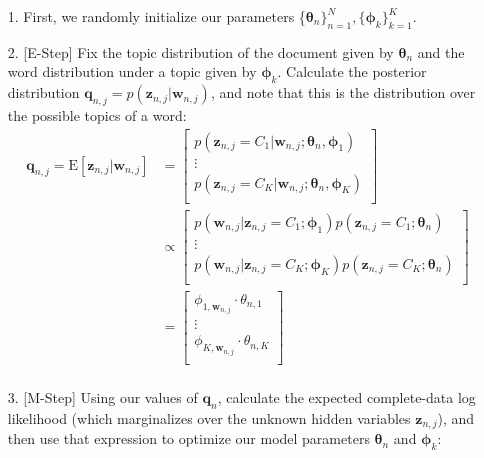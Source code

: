 \begin{itemize}
    \item[1.] First, we randomly initialize our parameters \{$\boldsymbol{\theta}_n \}_{n=1}^{N}, \{ \boldsymbol{\phi}_k\}_{k=1}^{K}$.
    \item[2.] [E-Step] Fix the topic distribution of the document given by $\boldsymbol{\theta}_n$ and the word distribution under a topic given by $\boldsymbol{\phi}_k$. Calculate the posterior distribution $\textbf{q}_{n, j} = p(\textbf{z}_{n, j} | \textbf{w}_{n, j})$, and note that this is the distribution over the possible topics of a word:
        \begin{align*}
            \textbf{q}_{n, j} = \mathrm{E}[\textbf{z}_{n, j} | \textbf{w}_{n, j}] &= \begin{bmatrix}
                p(\textbf{z}_{n, j} = C_1 | \textbf{w}_{n, j}; \boldsymbol{\theta}_n, \boldsymbol{\phi}_1) \\
                \vdots \\
                p(\textbf{z}_{n, j} = C_K | \textbf{w}_{n, j}; \boldsymbol{\theta}_n, \boldsymbol{\phi}_K) \\
            \end{bmatrix} \\
            &\propto \begin{bmatrix}
                p(\textbf{w}_{n, j} | \textbf{z}_{n, j} = C_1; \boldsymbol{\phi}_1) p(\textbf{z}_{n, j}  = C_1; \boldsymbol{\theta}_n) \\
                \vdots \\
                p(\textbf{w}_{n, j} | \textbf{z}_{n, j} = C_K; \boldsymbol{\phi}_K) p(\textbf{z}_{n, j}  = C_K; \boldsymbol{\theta}_n) \\
            \end{bmatrix} \\
            &= \begin{bmatrix}
                \phi_{1, \textbf{w}_{n, j}} \cdot \theta_{n, 1} \\
                \vdots \\
                \phi_{K, \textbf{w}_{n, j}} \cdot \theta_{n, K} \\
            \end{bmatrix} \\
        \end{align*}
    \item[3.] [M-Step] Using our values of $\textbf{q}_n$, calculate the expected complete-data log likelihood (which marginalizes over the unknown hidden variables $\textbf{z}_{n, j}$), and then use that expression to optimize our model parameters $\boldsymbol{\theta}_n$ and $\boldsymbol{\phi}_k$:

\end{itemize}
